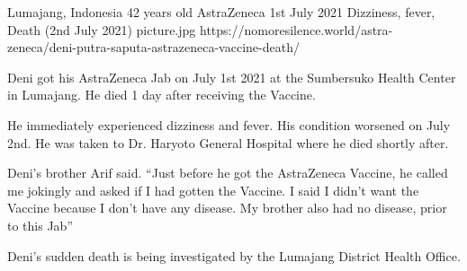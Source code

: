 {Lumajang, Indonesia}
{42 years old}
{AstraZeneca}
{1st July 2021}
{Dizziness, fever, Death (2nd July 2021)}
{picture.jpg}
{https://nomoresilence.world/astra-zeneca/deni-putra-saputa-astrazeneca-vaccine-death/}
{

Deni got his AstraZeneca Jab on July 1st 2021 at the Sumbersuko Health Center in
Lumajang. He died 1 day after receiving the Vaccine.

He immediately experienced dizziness and fever. His condition worsened on July
2nd. He was taken to Dr. Haryoto General Hospital where he died shortly after.

Deni’s brother Arif said. “Just before he got the AstraZeneca Vaccine, he called
me jokingly and asked if I had gotten the Vaccine. I said I didn’t want the
Vaccine because I don’t have any disease. My brother also had no disease, prior
to this Jab”

Deni’s sudden death is being investigated by the Lumajang District Health
Office.

}
